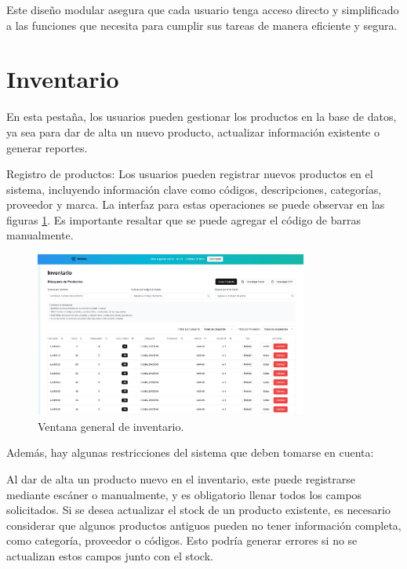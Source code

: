 Este diseño modular asegura que cada usuario tenga acceso directo y simplificado a las funciones que necesita para cumplir sus tareas de manera eficiente y segura. 

 

\section{Inventario}
\begin{justify}
En esta pestaña, los usuarios pueden gestionar los productos en la base de datos, ya sea para dar de alta un nuevo producto, actualizar información existente o generar reportes.
\end{justify}
\begin{justify}
Registro de productos: Los usuarios pueden registrar nuevos productos en el sistema, incluyendo información clave como códigos, descripciones, categorías, proveedor y marca. La interfaz para estas operaciones se puede observar en las figuras \ref{fig:inventory}. Es importante resaltar que se puede agregar el código de barras manualmente. 
\end{justify}

\begin{figure}[ht!]
\centering
\includegraphics[width=0.8\textwidth]{imgs/Almacen_General/inventario/inventario_1_general.png}
\caption{Ventana general de inventario.}
\label{fig:inventory}
\end{figure}




Además, hay algunas restricciones del sistema que deben tomarse en cuenta: 

Al dar de alta un producto nuevo en el inventario, este puede registrarse mediante escáner o manualmente, y es obligatorio llenar todos los campos solicitados. Si se desea actualizar el stock de un producto existente, es necesario considerar que algunos productos antiguos pueden no tener información completa, como categoría, proveedor o códigos. Esto podría generar errores si no se actualizan estos campos junto con el stock. 

